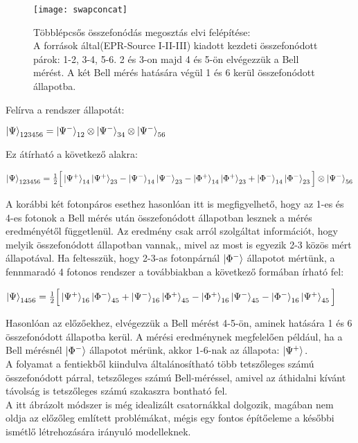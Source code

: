 \begin{figure}[h!]
\centering
\texttt{[image: swapconcat]}
\caption[Összefonódás megosztások összefűzése]{Többlépcsős összefonódás megosztás elvi felépítése:\\
A források által(EPR-Source I-II-III) kiadott kezdeti összefonódott párok: 1-2, 3-4, 5-6. 2 és 3-on majd 4 és 5-ön elvégezzük a Bell mérést. A két Bell mérés hatására végül 1 és 6 kerül összefonódott állapotba.}
\end{figure}

Felírva a rendszer állapotát:
\begin{center}
$ \ket{\Psi}_{123456}= \ket{\Psi^-}_{12} \otimes \ket{\Psi^-}_{34} \otimes \ket{\Psi^-}_{56} $
\end{center}
Ez átírható a következő alakra:
\begin{center}
$ \ket{\Psi}_{123456} = \frac{1}{2} \Big[ \ket{\Psi^+}_{14}\ket{\Psi^+}_{23}-\ket{\Psi^-}_{14}\ket{\Psi^-}_{23}-\ket{\Phi^+}_{14}\ket{\Phi^+}_{23} + \ket{\Phi^-}_{14}\ket{\Phi^-}_{23} \Big] \otimes \ket{\Psi^-}_{56} $
\end{center}
A korábbi két fotonpáros esethez hasonlóan itt is megfigyelhető, hogy az 1-es és 4-es fotonok a Bell mérés után összefonódott állapotban lesznek a mérés eredményétől függetlenül. Az eredmény csak arról szolgáltat információt, hogy melyik összefonódott állapotban vannak,, mivel az most is egyezik 2-3 közös mért állapotával.
Ha feltesszük, hogy 2-3-as fotonpárnál $ \ket{\Phi^-} $   állapotot mértünk, a fennmaradó 4 fotonos rendszer a továbbiakban a következő formában írható fel:
\begin{center}
$ \ket{\Psi}_{1456} = \frac{1}{2}\Big[ \ket{\Psi^+}_{16}\ket{\Phi^-}_{45}+\ket{\Psi^-}_{16}\ket{\Phi^+}_{45} - \ket{\Phi^+}_{16}\ket{\Psi^-}_{45} - \ket{\Phi^-}_{16}\ket{\Psi^+}_{45} \Big] $
\end{center}
Hasonlóan az előzőekhez, elvégezzük a Bell mérést 4-5-ön, aminek hatására 1 és 6 összefonódott állapotba kerül. A mérési eredménynek megfelelően például, ha a Bell mérésnél $\ket{\Phi^-} $ állapotot mérünk, akkor 1-6-nak az állapota: $ \ket{\Psi^+} . $ \\
A folyamat a fentiekből kiindulva általánosítható több tetszőleges számú összefonódott párral, tetszőleges számú Bell-méréssel, amivel az áthidalni kívánt távolság is tetszőleges számú szakaszra bontható fel.\\
A itt ábrázolt módszer is még idealizált csatornákkal dolgozik, magában nem oldja az előzőleg említett problémákat, mégis egy fontos építőeleme a későbbi ismétlő létrehozására irányuló modelleknek.
